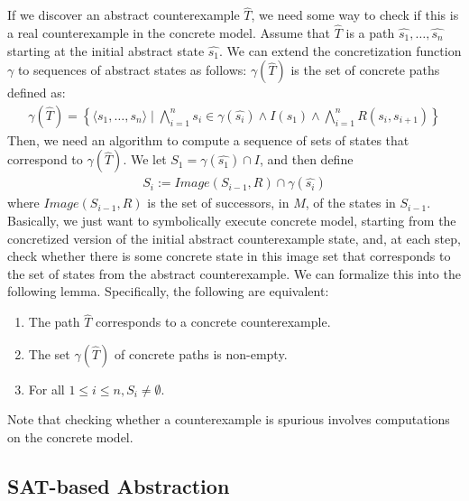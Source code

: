 \documentclass[10pt,a4paper]{article}
\begin{document}
If we discover an abstract counterexample $\widehat{T}$, we need some way to check if this is a real counterexample in the concrete model. Assume that $\widehat{T}$ is a path $\widehat{s_1},\dots, \widehat{s_n}$ starting at the initial abstract state $\widehat{s_1}$. We can extend the concretization function $\gamma$ to sequences of abstract states as follows: $\gamma(\widehat{T})$ is the set of concrete paths defined as:
\begin{align*}
    \gamma(\widehat{T}) = \left\lbrace \langle s_1,\dots,s_n \rangle \mid 
    \bigwedge_{i=1}^n s_i \in \gamma(\widehat{s_i}) \wedge I(s_1) \wedge 
    \bigwedge_{i=1}^n R(s_i,s_{i+1})
    \right\rbrace
\end{align*}
Then, we need an algorithm to compute a sequence of sets of states that correspond to $\gamma({\widehat{T}})$. We let $S_1 = \gamma(\widehat{s_1}) \cap I$, and then define 
\begin{align*}
    S_i := Image(S_{i-1}, R) \cap \gamma(\widehat{s_i})
\end{align*}
where $Image(S_{i-1}, R)$ is the set of successors, in $M$, of the states in $S_{i-1}$. Basically, we just want to symbolically execute concrete model, starting from the concretized version of the initial abstract counterexample state, and, at each step, check whether there is some concrete state in this image set that corresponds to the set of states from the abstract counterexample. We can formalize this into the following lemma. Specifically, the following are equivalent:
\begin{enumerate}
    \item The path $\widehat{T}$ corresponds to a concrete counterexample.
    \item The set $\gamma(\widehat{T})$ of concrete paths is non-empty.
    \item For all $1 \leq i \leq n, S_i \neq \emptyset$.
\end{enumerate}

Note that checking whether a counterexample is spurious involves computations on the concrete model.


\subsection*{SAT-based Abstraction}
\end{document}

